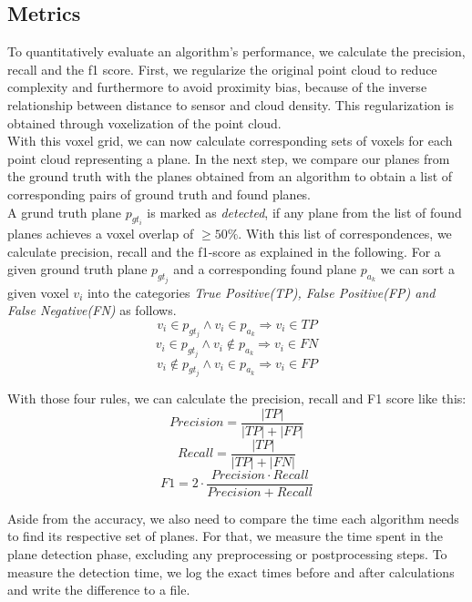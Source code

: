 \documentclass[main.tex]{subfiles}
\begin{document}
\subsection{Metrics}
To quantitatively evaluate an algorithm's performance, we calculate the precision, recall and the f1 score.
First, we regularize the original point cloud to reduce complexity and furthermore to avoid proximity bias, because of the inverse relationship
between distance to sensor and cloud density. This regularization is obtained through voxelization of the point cloud.\\
With this voxel grid, we can now calculate corresponding sets of voxels for each point cloud representing a plane.
In the next step, we compare our planes from the ground truth with the planes obtained from an algorithm to obtain a list of corresponding pairs
of ground truth and found planes.\\
A grund truth plane $p_{gt_i}$ is marked as \textit{detected}, if any plane from the list of found planes achieves a voxel overlap of $\geq 50\%$.
With this list of correspondences, we calculate precision, recall and the f1-score as explained in the following.
For a given ground truth plane $p_{gt_j}$ and a corresponding found plane $p_{a_k}$ we can sort a given voxel $v_i$ into the categories
\textit{True Positive(TP), False Positive(FP) and False Negative(FN)} as follows.
$$v_i \in p_{gt_j} \land v_i \in p_{a_k} \Rightarrow v_{i} \in TP$$
$$v_i \in p_{gt_j} \land v_i \notin p_{a_k} \Rightarrow v_{i} \in FN$$
$$v_i \notin p_{gt_j} \land v_i \in p_{a_k} \Rightarrow v_{i} \in FP$$

With those four rules, we can calculate the precision, recall and F1 score like this:
$$Precision = \frac{|TP|}{|TP|+|FP|}$$
$$Recall = \frac{|TP|}{|TP|+|FN|}$$
$$F1 = 2 \cdot\frac{Precision\cdot Recall}{Precision + Recall}$$

Aside from the accuracy, we also need to compare the time each algorithm needs to find its respective set of planes.
For that, we measure the time spent in the plane detection phase, excluding any preprocessing or postprocessing steps.
To measure the detection time, we log the exact times before and after calculations and write the difference to a file.\\
\end{document}
